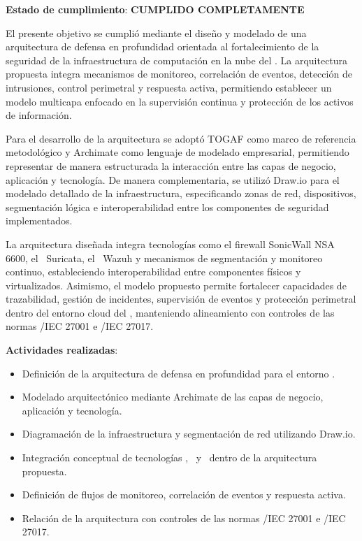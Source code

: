 \textbf{Estado de cumplimiento}: \textbf{CUMPLIDO COMPLETAMENTE}

El presente objetivo se cumplió mediante el diseño y modelado de una arquitectura de defensa en profundidad orientada al fortalecimiento de 
la seguridad de la infraestructura de computación en la nube del \GRID. La arquitectura propuesta integra mecanismos de monitoreo, 
correlación de eventos, detección de intrusiones, control perimetral y respuesta activa, permitiendo establecer un modelo multicapa 
enfocado en la supervisión continua y protección de los activos de información.

Para el desarrollo de la arquitectura se adoptó TOGAF como marco de referencia metodológico y Archimate como lenguaje de modelado 
empresarial, permitiendo representar de manera estructurada la interacción entre las capas de negocio, aplicación y tecnología. De manera 
complementaria, se utilizó Draw.io para el modelado detallado de la infraestructura, especificando zonas de red, dispositivos, segmentación 
lógica e interoperabilidad entre los componentes de seguridad implementados.

La arquitectura diseñada integra tecnologías como el firewall SonicWall NSA 6600, el \IDPS\ Suricata, el \SIEM\ Wazuh y mecanismos de 
segmentación y monitoreo continuo, estableciendo interoperabilidad entre componentes físicos y virtualizados. Asimismo, el modelo propuesto 
permite fortalecer capacidades de trazabilidad, gestión de incidentes, supervisión de eventos y protección perimetral dentro del entorno 
cloud del \GRID, manteniendo alineamiento con controles de las normas \ISO/IEC 27001 e \ISO/IEC 27017.

\textbf{Actividades realizadas}:
\begin{itemize}
    \item Definición de la arquitectura de defensa en profundidad para el entorno \GRID.
	\item Modelado arquitectónico mediante Archimate de las capas de negocio, aplicación y tecnología.
	\item Diagramación de la infraestructura y segmentación de red utilizando Draw.io.
	\item Integración conceptual de tecnologías \SIEM, \IDPS\ y \UTM\ dentro de la arquitectura propuesta.
	\item Definición de flujos de monitoreo, correlación de eventos y respuesta activa.
	\item Relación de la arquitectura con controles de las normas \ISO/IEC 27001 e \ISO/IEC 27017.
\end{itemize}

